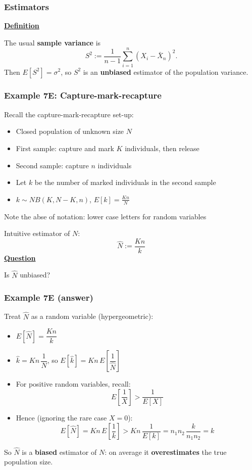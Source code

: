 \documentclass[t,8pt]{beamer}
\begin{document}
\begin{frame}
	\frametitle{Estimators}
	{\bf\underline{Definition}} \par
	The usual {\bf sample variance} is
	\[
	S^2:=\frac{1}{n-1}\sum_{i=1}^n(X_i-\bar X_n)^2.
	\]
	Then $E[S^2]=\sigma^2$, so $S^2$ is an {\bf unbiased} estimator of the population variance.
\end{frame}

\begin{frame}
	\frametitle{Example 7E: Capture-mark-recapture}
	Recall the capture-mark-recapture set-up:
	\begin{itemize}
		\item Closed population of unknown size $N$
		\item First sample: capture and mark $K$ individuals, then release
		\item Second sample: capture $n$ individuals
		\item Let $k$ be the number of marked individuals in the second sample
		\item $k\sim NB(K,N-K,n)$, $E[k]=\frac{Kn}{N}$
	\end{itemize}
	{\small\color{NavyBlue} Note the abse of notation: lower case letters for random variables} \par
	Intuitive estimator of $N$:
	$$\hat N := \frac{Kn}{k}$$
	{\bf\underline{Question}} \par
	Is $\hat N$ unbiased?
\end{frame}

\begin{frame}
	\frametitle{Example 7E (answer)}
	Treat $\hat N$ as a random variable (hypergeometric):
	\begin{itemize}
		\item $E[\hat N] = \dfrac{Kn}{k}$
		\item $\hat k = Kn \,\dfrac{1}{N}$, so $E[\hat k] = Kn\,E\left[\dfrac{1}{\hat N}\right]$
		\item For positive random variables, recall:
		$$E\left[\frac{1}{X}\right] > \frac{1}{E[X]}$$
		\item Hence (ignoring the rare case $X=0$):
		$$E[\hat N] = Kn\,E\left[\frac{1}{k}\right] > Kn\,\frac{1}{E[k]}
		= n_1 n_2\,\frac{k}{n_1 n_2} = k$$
	\end{itemize}
	So $\hat N$ is a {\bf biased} estimator of $N$: on average it {\bf overestimates} the true population size.
\end{frame}
\end{document}
